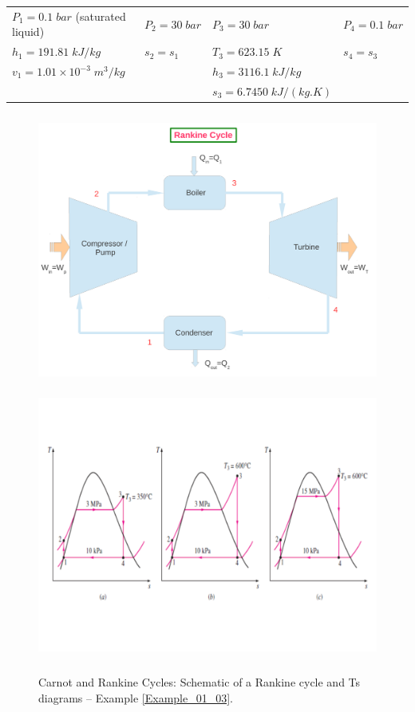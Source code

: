 \begin{enumerate}
\begin{enumerate}
\begin{tabular}{l l l l}
$P_{1}=0.1\;bar$ (saturated liquid) &  $P_{2}=30\;bar$ & $P_{3}=30\;bar$           & $P_{4}=0.1\;bar$ \\
$h_{1}=191.81\;kJ/kg$               &  $s_{2}=s_{1}$   & $T_{3}=623.15\;K$         & $s_{4}=s_{3}$ \\
$v_{1}=1.01\times 10^{-3}\;m^{3}/kg$ &                  & $h_{3}=3116.1\;kJ/kg$     &                 \\
                                    &                 & $s_{3}=6.7450\;kJ/(kg.K)$ &                 \\
\end{tabular}


\begin{figure}[h]
\begin{center}
\vbox{
\includegraphics[width=13.0cm,height=9.0cm]{./Pics/Simple_Rankine_Cycle_2}
\vspace{-1.cm}
\includegraphics[width=15.0cm,height=9.0cm]{./Pics/example01_03}
}
\end{center}
\caption{Carnot and Rankine Cycles: Schematic of a Rankine cycle and Ts diagrams -- Example \ref{Example_01_03}.}
\label{Example01_01:Pic3}
\end{figure}


\end{enumerate}
\end{enumerate}
